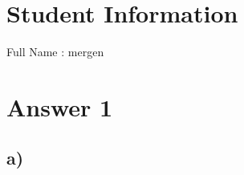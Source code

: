 \documentclass[11pt]{article}
\begin{document}
\section*{Student Information } 
Full Name : mergen \\


\section*{Answer 1}
\subsection*{a)}
\end{document}
